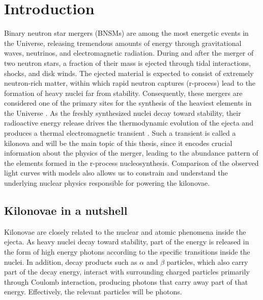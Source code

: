 \chapter{Introduction}\label{ch:introduction}

Binary neutron star mergers (BNSMs) are among the most energetic events in the Universe, releasing tremendous amounts of energy through gravitational waves, neutrinos, and electromagnetic radiation. 
During and after the merger of two neutron stars, a fraction of their mass is ejected through tidal interactions, shocks, and disk winds. 
The ejected material is expected to consist of extremely neutron-rich matter, within which rapid neutron captures (r-process) lead to the formation of heavy nuclei far from stability. 
Consequently, these mergers are considered one of the primary sites for the synthesis of the heaviest elements in the Universe \cite{cowan_origin_2021,rosswog_heavy_2024}. 
As the freshly synthesized nuclei decay toward stability, their radioactive energy release drives the thermodynamic evolution of the ejecta and produces a thermal electromagnetic transient \cite{metzger_electromagnetic_2010}.
Such a transient is called a kilonova and will be the main topic of this thesis, since it encodes crucial information about the physics of the merger, leading to the abundance pattern of the elements formed in the r-process nucleosynthesis.
Comparison of the observed light curves with models also allows us to constrain and understand the underlying nuclear physics responsible for powering the kilonovae.

\section{Kilonovae in a nutshell}\label{in_a_nutshell}

Kilonovae are closely related to the nuclear and atomic phenomena inside the ejecta.
As heavy nuclei decay toward stability, part of the energy is released in the form of high energy photons according to the specific transitions inside the nuclei. 
In addition, decay products such as $\alpha$ and $\beta$ particles, which also carry part of the decay energy, interact with surrounding charged particles primarily through Coulomb interaction, producing photons that carry away part of that energy.
Effectively, the relevant particles will be photons.

